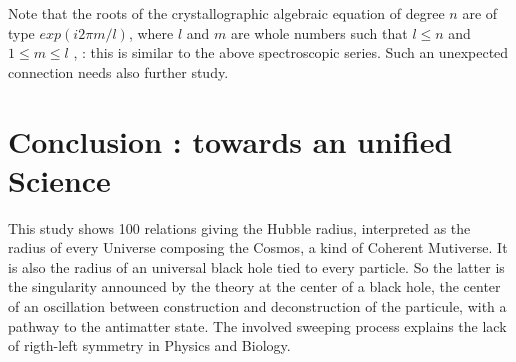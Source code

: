 \documentclass[a4paper,9pt]{article}
\begin{document}
    Note that the roots of the crystallographic algebraic equation of degree $n$ are of type $exp(i2\pi m/l)$, where $l$ and $m$ are whole numbers such that $ l \leq n $ and $ 1 \leq m \leq l $ ,  : this is similar to the above spectroscopic series. Such an unexpected connection needs also further study.   







    





\section{Conclusion : towards an unified Science}

This study shows 100 relations giving the Hubble radius, interpreted as the radius of every Universe composing the Cosmos, a kind of Coherent Mutiverse. It is also the radius of an universal black hole tied to every particle. So the latter is the singularity announced by the theory at the center of a black hole, the center of an oscillation between construction and deconstruction of the particule, with a pathway to the antimatter state. The involved sweeping process explains the lack of rigth-left symmetry  in Physics and Biology.
\end{document}
